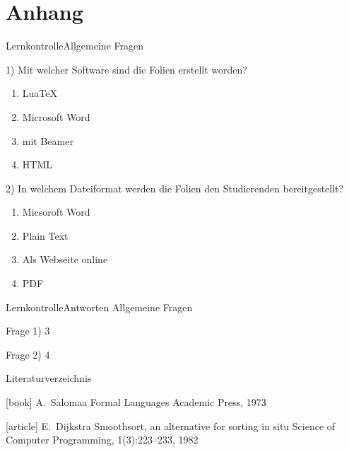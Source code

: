 \section{Anhang}
\begin{frame}{Lernkontrolle}{Allgemeine Fragen}
    \begin{footnotesize}
        1) Mit welcher Software sind die Folien erstellt worden?

        \begin{enumerate}
            \item LuaTeX
            \item Microsoft Word
            \item \latex mit Beamer
            \item HTML
        \end{enumerate}

        2) In welchem Dateiformat werden die Folien den Studierenden bereitgestellt?

        \begin{enumerate}
            \item Micsoroft Word
            \item Plain Text
            \item Als Webseite online
            \item PDF
        \end{enumerate}
    \end{footnotesize}
\end{frame}

\begin{frame}{Lernkontrolle}{Antworten}
    Allgemeine Fragen
    \medskip

    \begin{footnotesize}
    Frage 1) 3
    \medskip

    Frage 2) 4
    \end{footnotesize}
\end{frame}

\begin{frame}{Literaturverzeichnis}
    \begin{thebibliography}{Längste Bezeichnung}
        [book]
            A.~Salomaa
            \newblock Formal Languages
            \newblock Academic Press, 1973

        [article]
            E.~Dijkstra
            \newblock Smoothsort, an alternative for sorting in situ
            \newblock Science of Computer Programming, 1(3):223--233, 1982
    \end{thebibliography}
\end{frame}

